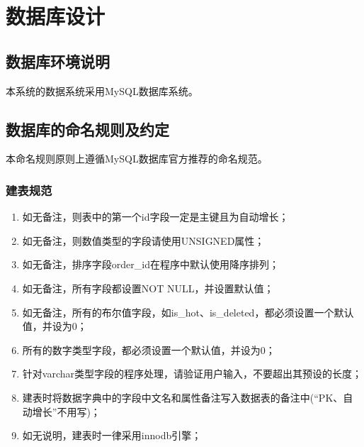 \chapter{数据库设计}
\section{数据库环境说明}


本系统的数据系统采用MySQL数据库系统。

\section{数据库的命名规则及约定}


本命名规则原则上遵循MySQL数据库官方推荐的命名规范。
\subsection{建表规范}
\begin{enumerate}
    \item 如无备注，则表中的第一个id字段一定是主键且为自动增长；
    \item 如无备注，则数值类型的字段请使用UNSIGNED属性；
    \item 如无备注，排序字段order\_id在程序中默认使用降序排列；
    \item 如无备注，所有字段都设置NOT NULL，并设置默认值；
    \item 如无备注，所有的布尔值字段，如is\_hot、is\_deleted，都必须设置一个默认值，并设为0；
    \item 所有的数字类型字段，都必须设置一个默认值，并设为0；
    \item 针对varchar类型字段的程序处理，请验证用户输入，不要超出其预设的长度；
    \item 建表时将数据字典中的字段中文名和属性备注写入数据表的备注中(“PK、自动增长”不用写)；
    \item 如无说明，建表时一律采用innodb引擎；
\end{enumerate}

